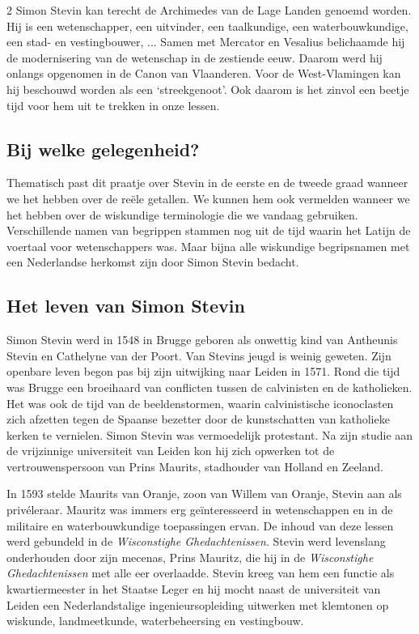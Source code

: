 \begin{multicols}{2}
    Simon Stevin kan terecht de Archimedes van de Lage Landen genoemd worden. Hij is een wetenschapper, een uitvinder, een taalkundige, een waterbouwkundige, een stad- en vestingbouwer, ... Samen met Mercator en Vesalius belichaamde hij de modernisering van de wetenschap in de zestiende eeuw. Daarom werd hij onlangs opgenomen in de Canon van Vlaanderen. Voor de West-Vlamingen kan hij beschouwd worden als een `streekgenoot'. Ook daarom is het zinvol een beetje tijd voor hem uit te trekken in onze lessen. 


    \subsection*{Bij welke gelegenheid?}
    
    Thematisch past dit praatje over Stevin in de eerste en de tweede graad wanneer we het hebben over de reële getallen. We kunnen hem ook vermelden wanneer we het hebben over de wiskundige terminologie die we vandaag gebruiken. Verschillende namen van begrippen stammen nog uit de tijd waarin het Latijn de voertaal voor wetenschappers was. Maar bijna alle wiskundige begripsnamen met een Nederlandse herkomst zijn door Simon Stevin bedacht.
    

    \subsection*{Het leven van Simon Stevin}

    Simon Stevin werd in 1548 in Brugge geboren als onwettig kind van Antheunis Stevin en Cathelyne van der Poort. Van Stevins jeugd is weinig geweten. Zijn openbare leven begon pas bij zijn uitwijking naar Leiden in 1571. Rond die tijd was Brugge een broeihaard van conflicten tussen de calvinisten en de katholieken. Het was ook de tijd van de beeldenstormen, waarin calvinistische iconoclasten zich afzetten tegen de Spaanse bezetter door de kunstschatten van katholieke kerken te vernielen. Simon Stevin was vermoedelijk protestant. Na zijn studie aan de vrijzinnige universiteit van Leiden kon hij zich opwerken tot de vertrouwenspersoon van Prins Maurits, stadhouder van Holland en Zeeland.

    In 1593 stelde Maurits van Oranje, zoon van Willem van Oranje, Stevin aan als privéleraar. Mauritz was immers erg geïnteresseerd in wetenschappen en in de militaire en waterbouwkundige toepassingen ervan. De inhoud van deze lessen werd gebundeld in de \emph{Wisconstighe Ghedachtenissen}. Stevin werd levenslang onderhouden door zijn mecenas, Prins Mauritz, die hij in de \emph{Wisconstighe Ghedachtenissen} met alle eer overlaadde. Stevin kreeg van hem een functie als kwartiermeester in het Staatse Leger en hij mocht naast de universiteit van Leiden een Nederlandstalige ingenieursopleiding uitwerken met klemtonen op wiskunde, landmeetkunde, waterbeheersing en vestingbouw.
      

\end{multicols}
